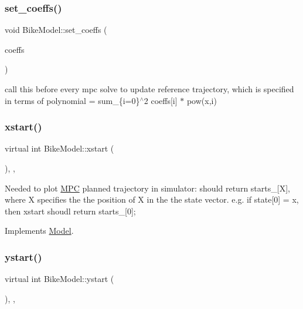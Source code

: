 \subsubsection{\texorpdfstring{set\+\_\+coeffs()}{set\_coeffs()}}
{\footnotesize\ttfamily void Bike\+Model\+::set\+\_\+coeffs (\begin{DoxyParamCaption}\item[{const Vector\+Xd \&}]{coeffs }\end{DoxyParamCaption})\hspace{0.3cm}{\ttfamily [inline]}}

call this before every mpc solve to update reference trajectory, which is specified in terms of polynomial = sum\+\_\+\{i=0\}$^\wedge$2 coeffs\mbox{[}i\mbox{]} $\ast$ pow(x,i) \mbox{\label{classBikeModel_a920787379d6fef804f46bc1f3f885a89}} 
\subsubsection{\texorpdfstring{xstart()}{xstart()}}
{\footnotesize\ttfamily virtual int Bike\+Model\+::xstart (\begin{DoxyParamCaption}{ }\end{DoxyParamCaption})\hspace{0.3cm}{\ttfamily [inline]}, {\ttfamily [override]}, {\ttfamily [virtual]}}

Needed to plot \mbox{\hyperlink{classMPC}{M\+PC}} planned trajectory in simulator\+: should return starts\+\_\+\mbox{[}X\mbox{]}, where X specifies the the position of X in the the state vector. e.\+g. if state\mbox{[}0\mbox{]} = x, then xstart shoudl return starts\+\_\+\mbox{[}0\mbox{]}; 

Implements \mbox{\hyperlink{classModel_ab98f8c18036d9bada533325300865c5e}{Model}}.

\mbox{\label{classBikeModel_a05b988f106df902d1222dfb662d4b1fa}} 
\subsubsection{\texorpdfstring{ystart()}{ystart()}}
{\footnotesize\ttfamily virtual int Bike\+Model\+::ystart (\begin{DoxyParamCaption}{ }\end{DoxyParamCaption})\hspace{0.3cm}{\ttfamily [inline]}, {\ttfamily [override]}, {\ttfamily [virtual]}}

